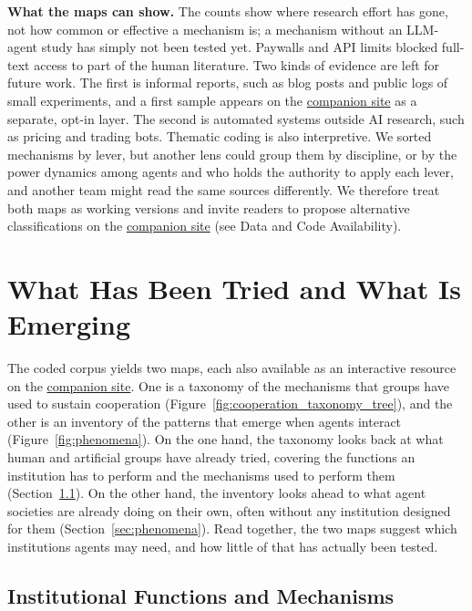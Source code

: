 \documentclass[runningheads]{llncs}
\begin{document}
\textbf{What the maps can show.} The counts show where research effort has gone, not how common or effective a mechanism is; a mechanism without an LLM-agent study has simply not been tested yet. Paywalls and API limits blocked full-text access to part of the human literature. Two kinds of evidence are left for future work. The first is informal reports, such as blog posts and public logs of small experiments, and a first sample appears on the \href{https://van-truong.github.io/institutional-design-for-ai-agents/}{companion site} as a separate, opt-in layer. The second is automated systems outside AI research, such as pricing and trading bots. Thematic coding is also interpretive. We sorted mechanisms by lever, but another lens could group them by discipline, or by the power dynamics among agents and who holds the authority to apply each lever, and another team might read the same sources differently. We therefore treat both maps as working versions and invite readers to propose alternative classifications on the \href{https://van-truong.github.io/institutional-design-for-ai-agents/}{companion site} (see Data and Code Availability).

\section{What Has Been Tried and What Is Emerging}\label{sec:map}

The coded corpus yields two maps, each also available as an interactive resource on the \href{https://van-truong.github.io/institutional-design-for-ai-agents/}{companion site}. One is a taxonomy of the mechanisms that groups have used to sustain cooperation (Figure~\mbox{\ref{fig:cooperation_taxonomy_tree}}), and the other is an inventory of the patterns that emerge when agents interact (Figure~\mbox{\ref{fig:phenomena}}). On the one hand, the taxonomy looks back at what human and artificial groups have already tried, covering the functions an institution has to perform and the mechanisms used to perform them (Section~\mbox{\ref{sec:functions}}). On the other hand, the inventory looks ahead to what agent societies are already doing on their own, often without any institution designed for them (Section~\mbox{\ref{sec:phenomena}}). Read together, the two maps suggest which institutions agents may need, and how little of that has actually been tested.

\subsection{Institutional Functions and Mechanisms}\label{sec:functions}
\end{document}
